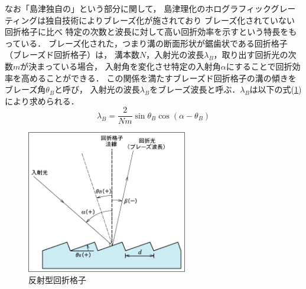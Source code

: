 \documentclass[11pt,a4paper]{jsarticle}
\begin{document}
			\par なお「島津独自の」という部分に関して，
			島津理化のホログラフィックグレーティングは独自技術によりブレーズ化が施されており
			ブレーズ化されていない回折格子に比べ
			特定の次数と波長に対して高い回折効率を示すという特長をもっている．
			ブレーズ化された，つまり溝の断面形状が鋸歯状である回折格子（ブレーズド回折格子）は，
			溝本数$N$，入射光の波長$\lambda_B$，取り出す回折光の次数$m$が決まっている場合，
			入射角を変化させ特定の入射角$\alpha$にすることで回折効率を高めることができる．
			この関係を満たすブレーズド回折格子の溝の傾きをブレーズ角$\theta_B$と呼び，
			入射光の波長$\lambda_B$をブレーズ波長と呼ぶ．$\lambda_B$は以下の式(\ref{ブレーズ波長})により求められる．
				\begin{equation}
					\lambda_B = \frac{2}{Nm} \sin{\theta_B} \cos{(\alpha - \theta_B)}
					\label{ブレーズ波長}
				\end{equation}
				\begin{figure}[H]
							\begin{center}
								\includegraphics[width=70mm]{zu_05.png}
							\end{center}
							\caption{反射型回折格子 \cite{島津回折格子}}
							\label{ブレーズ波長}
						\end{figure}　
\end{document}
